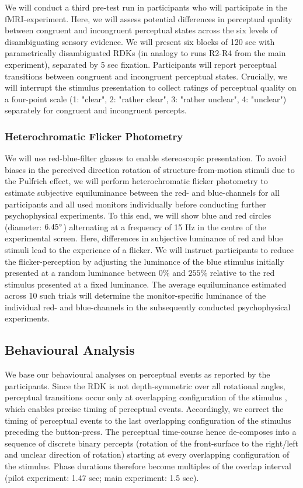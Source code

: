 \documentclass[12pt]{article}
\begin{document}
We will conduct a third pre-test run in participants who will participate in the fMRI-experiment. Here, we will assess potential differences in perceptual quality between congruent and incongruent perceptual states across the six levels of disambiguating sensory evidence. We will present six blocks of 120 sec with parametrically disambiguated RDKs (in analogy to runs R2-R4 from the main experiment), separated by 5 sec fixation. Participants will report perceptual transitions between congruent and incongruent perceptual states. Crucially, we will interrupt the stimulus presentation to collect ratings of perceptual quality on a four-point scale (1: "clear", 2: "rather clear", 3: "rather unclear", 4: "unclear") separately for congruent and incongruent percepts.

\subsubsection{Heterochromatic Flicker Photometry}
We will use red-blue-filter glasses to enable stereoscopic presentation. To avoid biases in the perceived direction rotation of structure-from-motion stimuli due to the Pulfrich effect, we will perform heterochromatic flicker photometry to estimate subjective equiluminance between the red- and blue-channels for all participants and all used monitors individually before conducting further psychophysical experiments. To this end, we will show blue and red circles (diameter: $6.45\degree$) alternating at a frequency of 15 Hz in the centre of the experimental screen. Here, differences in subjective luminance of red and blue stimuli lead to the experience of a flicker. We will instruct participants to reduce the flicker-perception by adjusting the luminance of the blue stimulus initially presented at a random luminance between $0\%$ and $255\%$ relative to the red stimulus presented at a fixed luminance. The average equiluminance estimated across 10 such trials will determine the monitor-specific luminance of the individual red- and blue-channels in the subsequently conducted psychophysical experiments. 

\subsection{Behavioural Analysis}
We base our behavioural analyses on perceptual events as reported by the participants. Since the RDK is not depth-symmetric over all rotational angles, perceptual transitions occur only at overlapping configuration of the stimulus \parencite{Pastukhov2012a, Weilnhammer2013}, which enables precise timing of perceptual events. Accordingly, we correct the timing of perceptual events to the last overlapping configuration of the stimulus preceding the button-press. The perceptual time-course hence de-composes into a sequence of discrete binary percepts (rotation of the front-surface to the right/left and unclear direction of rotation) starting at every overlapping configuration of the stimulus. Phase durations therefore become multiples of the overlap interval (pilot experiment: 1.47 sec; main experiment: 1.5 sec). 
\end{document}
